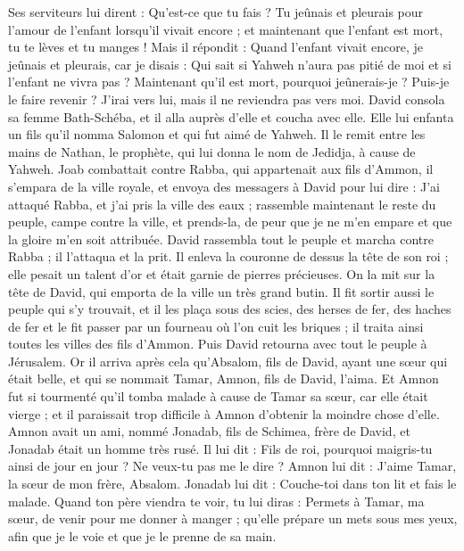 \begin{multicols}{2}
Ses serviteurs lui dirent : Qu'est-ce que tu fais ? Tu jeûnais et pleurais pour l’amour de l'enfant lorsqu'il vivait encore ; et maintenant que l'enfant est mort, tu te lèves et tu manges !
Mais il répondit : Quand l'enfant vivait encore, je jeûnais et pleurais, car je disais : Qui sait si Yahweh n’aura pas pitié de moi et si l'enfant ne vivra pas ?
Maintenant qu'il est mort, pourquoi jeûnerais-je ? Puis-je le faire revenir ? J’irai vers lui, mais il ne reviendra pas vers moi.
David consola sa femme Bath-Schéba, et il alla auprès d’elle et coucha avec elle. Elle lui enfanta un fils qu'il nomma Salomon et qui fut aimé de Yahweh.
Il le remit entre les mains de Nathan, le prophète, qui lui donna le nom de Jedidja, à cause de Yahweh.
Joab combattait contre Rabba, qui appartenait aux fils d’Ammon, il s’empara de la ville royale,
et envoya des messagers à David pour lui dire : J'ai attaqué Rabba, et j'ai pris la ville des eaux ;
rassemble maintenant le reste du peuple, campe contre la ville, et prends-la, de peur que je ne m’en empare et que la gloire m’en soit attribuée.
David rassembla tout le peuple et marcha contre Rabba ; il l’attaqua et la prit.
Il enleva la couronne de dessus la tête de son roi ; elle pesait un talent d'or et était garnie de pierres précieuses. On la mit sur la tête de David, qui emporta de la ville un très grand butin.
Il fit sortir aussi le peuple qui s’y trouvait, et il les plaça sous des scies, des herses de fer, des haches de fer et le fit passer par un fourneau où l'on cuit les briques ; il traita ainsi toutes les villes des fils d’Ammon. Puis David retourna avec tout le peuple à Jérusalem.
\VerseOne{}Or il arriva après cela qu’Absalom, fils de David, ayant une sœur qui était belle, et qui se nommait Tamar, Amnon, fils de David, l'aima.
Et Amnon fut si tourmenté qu’il tomba malade à cause de Tamar sa sœur, car elle était vierge ; et il paraissait trop difficile à Amnon d’obtenir la moindre chose d’elle.
Amnon avait un ami, nommé Jonadab, fils de Schimea, frère de David, et Jonadab était un homme très rusé.
Il lui dit : Fils de roi, pourquoi maigris-tu ainsi de jour en jour ? Ne veux-tu pas me le dire ? Amnon lui dit : J'aime Tamar, la sœur de mon frère, Absalom.
Jonadab lui dit : Couche-toi dans ton lit et fais le malade. Quand ton père viendra te voir, tu lui diras : Permets à Tamar, ma sœur, de venir pour me donner à manger ; qu’elle prépare un mets sous mes yeux, afin que je le voie et que je le prenne de sa main.

\end{multicols}
